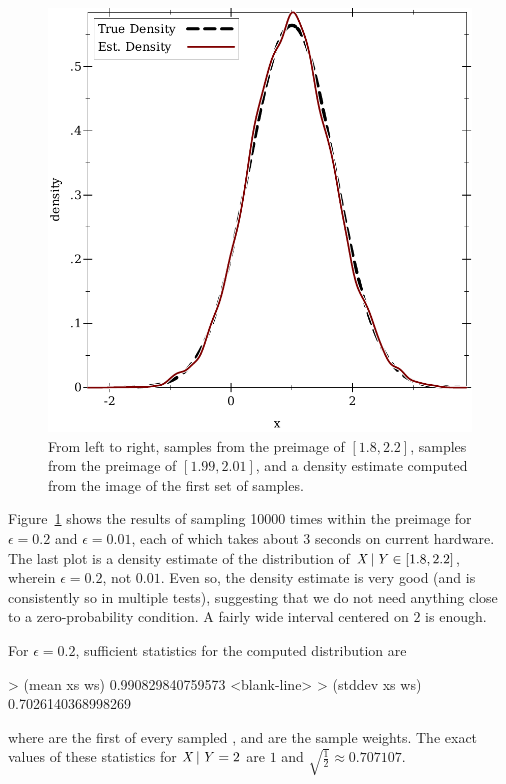 \begin{figure}[tb!]
\includegraphics[width=\subfigurewidth]{results/normal-normal-density}%
\caption[Samples from Dr. Bayes and a density estimate]{From left to right, samples from the preimage of {$[1.8,2.2]$}, samples from the preimage of {$[1.99,2.01]$}, and a density estimate computed from the image of the first set of samples.}%
\label{fig:normal-normal}
\end{figure}

Figure~\ref{fig:normal-normal} shows the results of sampling 10000 times within the preimage for $\epsilon = 0.2$ and $\epsilon = 0.01$, each of which takes about 3 seconds on current hardware.
The last plot is a density estimate of the distribution of $\mathit{X} \,|\, \mathit{Y} \in [1.8,2.2]$, wherein $\epsilon = 0.2$, not $0.01$.
Even so, the density estimate is very good (and is consistently so in multiple tests), suggesting that we do not need anything close to a zero-probability condition.
A fairly wide interval centered on $2$ is enough.

For $\epsilon = 0.2$, sufficient statistics for the computed distribution are
\begin{center}\singlespacing
\begin{schemedisplay}
> (mean xs ws)
0.990829840759573
<blank-line>
> (stddev xs ws)
0.7026140368998269
\end{schemedisplay}
\end{center}
where  are the first of every sampled , and  are the sample weights.
The exact values of these statistics for $\mathit{X} \,|\, \mathit{Y} = 2$ are $1$ and $\sqrt{\frac{1}{2}} \approx 0.707107$.

